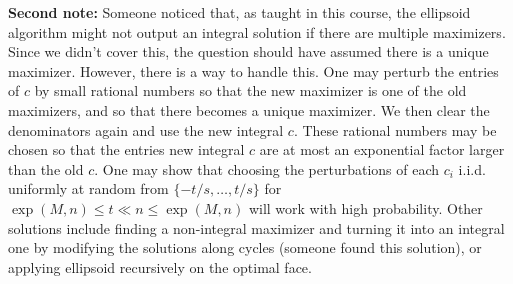 \documentclass[12pt]{article}
\begin{document}
\begin{enumerate}
\begin{enumerate}
\textbf{Second note: } Someone noticed that, as taught in this course, the ellipsoid algorithm might not output an integral solution if there are multiple maximizers. Since we didn't cover this, the question should have assumed there is a unique maximizer. However, there is a way to handle this. One may perturb the entries of $c$ by small rational numbers so that the new maximizer is one of the old maximizers, and so that there becomes a unique maximizer. We then clear the denominators again and use the new integral $c$. These rational numbers may be chosen so that the entries new integral $c$ are at most an exponential factor larger than the old $c$. One may show that choosing the perturbations of each $c_i$ i.i.d. uniformly at random from $\{-t/s, \dots, t/s\}$ for $\exp(M, n) \leq t  \ll n \leq \exp (M, n)$ will work with high probability. Other solutions include finding a non-integral maximizer and turning it into an integral one by modifying the solutions along cycles (someone found this solution), or applying ellipsoid recursively on the optimal face.
\end{enumerate}


\newpage




\end{enumerate}
\end{document}
